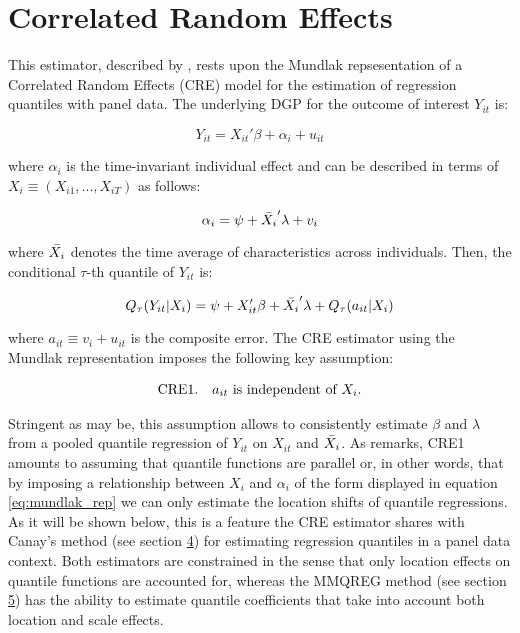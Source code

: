 \documentclass[bib]{statapress}
\begin{document}
\section{Correlated Random Effects}\label{sec:cre}

This estimator, described by \citep{wooldridge2010}, rests upon the
Mundlak repsesentation of a Correlated Random Effects (CRE) model for
the estimation of regression quantiles with panel data. The underlying
DGP for the outcome of interest \(Y_{it}\) is:

\[\label{eq:dgp_cre}
    Y_{it} = X_{it}' \beta + \alpha_i + u_{it}\]

where \(\alpha_i\) is the time-invariant individual effect and can be
described in terms of \(X_i \equiv (X_{i1},...,X_{iT})\) as follows:

\[\label{eq:mundlak_rep}
    \alpha_i = \psi + \Bar{X_i}' \lambda + v_i\]

where \(\Bar{X_i}\) denotes the time average of characteristics across
individuals. Then, the conditional \(\tau\)-th quantile of \(Y_{it}\)
is:

\[\label{eq:qr_cre}
    Q_{\tau}(Y_{it} | X_i) = \psi + X_{it}' \beta + \Bar{X_i}' \lambda + Q_{\tau}(a_{it} | X_i)\]

where \(a_{it} \equiv v_i + u_{it}\) is the composite error. The CRE
estimator using the Mundlak representation imposes the following key
assumption:

\[\begin{gathered}
    \text{CRE1.\quad $a_{it}$ is independent of $X_i$.}\label{eq:cre1}
\end{gathered}\]

Stringent as may be, this assumption allows to consistently estimate
\(\beta\) and \(\lambda\) from a pooled quantile regression of
\(Y_{it}\) on \(X_{it}\) and \(\Bar{X_{i}}\). As \citep{wooldridge2010}
remarks, CRE1 amounts to assuming that quantile functions are parallel
or, in other words, that by imposing a relationship between \(X_{i}\)
and \(\alpha_i\) of the form displayed in equation
\hyperref[eq:mundlak_rep]{{[}eq:mundlak\_rep{]}} we can only estimate
the location shifts of quantile regressions. As it will be shown below,
this is a feature the CRE estimator shares with Canay's method (see
section \hyperref[sec:canay]{4}) for estimating regression quantiles in
a panel data context. Both estimators are constrained in the sense that
only location effects on quantile functions are accounted for, whereas
the MMQREG method (see section \hyperref[sec:mmqreg]{5}) has the ability
to estimate quantile coefficients that take into account both location
and scale effects.
\end{document}
